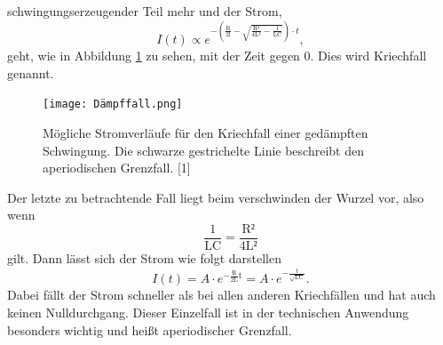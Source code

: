 \documentclass[titlepage = firstcover]{scrartcl}
\begin{document}
            schwingungserzeugender Teil mehr und der Strom,
            \begin{equation}
                I(t) \propto e^{-\left(\frac{\text{R}}{\text{2l}}-\sqrt{\frac{\text{R²}}{\text{4L²}}-\frac{1}{\text{LC}}}\right)\cdot t} ,
                \label{eqn:Dämpffall}
            \end{equation}
            geht, wie in Abbildung \ref{fig:RDämpfungLC} zu sehen, mit der Zeit gegen 0. Dies wird Kriechfall genannt.
            \begin{figure}[h]
                \centering
                \caption{Mögliche Stromverläufe für den Kriechfall einer gedämpften Schwingung. Die schwarze gestrichelte Linie beschreibt den aperiodischen Grenzfall. [1]}
                \texttt{[image: Dämpffall.png]}
                \label{fig:RDämpfungLC}
            \end{figure}
            \FloatBarrier
            Der letzte zu betrachtende Fall liegt beim verschwinden der Wurzel vor, also wenn
            \begin{equation*}
                \frac{1}{\text{LC}} = \frac{\text{R²}}{\text{4L²}}
            \end{equation*}
            gilt. Dann lässt sich der Strom wie folgt darstellen
            \begin{equation}
                I(t) = A \cdot e^{-\frac{\text{R}}{\text{2L}}\text{t}} = A \cdot e^{-\frac{\text{t}}{\sqrt{\text{LC}}}}.
                \label{eqn:aperio}
            \end{equation}
            Dabei fällt der Strom schneller als bei allen anderen Kriechfällen und hat auch keinen Nulldurchgang. Dieser Einzelfall ist in der 
            technischen Anwendung besonders wichtig und heißt aperiodischer Grenzfall.
\end{document}
